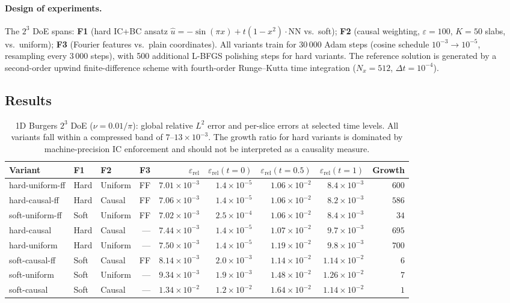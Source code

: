 \documentclass{article}
\newcommand{\relL}{\varepsilon_{\mathrm{rel}}}
\begin{document}
\paragraph{Design of experiments.}
The $2^3$ DoE spans: \textbf{F1} (hard IC+BC ansatz
$\hat{u} = -\sin(\pi x) + t(1{-}x^2)\cdot\mathrm{NN}$ vs.\ soft);
\textbf{F2} (causal weighting, $\varepsilon=100$, $K=50$ slabs,
vs.\ uniform); \textbf{F3} (Fourier features vs.\ plain coordinates).
All variants train for 30\,000 Adam steps (cosine schedule $10^{-3}\to10^{-5}$,
resampling every 3\,000 steps), with 500 additional L-BFGS polishing steps for
hard variants.
The reference solution is generated by a second-order upwind finite-difference
scheme with fourth-order Runge--Kutta time integration ($N_x = 512$,
$\Delta t = 10^{-4}$).

\subsection{Results}

\begin{table}[h]
\centering
\caption{1D Burgers $2^3$ DoE ($\nu=0.01/\pi$): global relative $L^2$ error
and per-slice errors at selected time levels.
All variants fall within a compressed band of $7\text{--}13\times10^{-3}$.
The growth ratio for hard variants is dominated by machine-precision IC
enforcement and should not be interpreted as a causality measure.}
\label{tab:burgers}
\small
\begin{tabular}{lllrrrrrr}
\toprule
Variant & F1 & F2 & F3 & $\relL$
        & $\relL(t{=}0)$ & $\relL(t{=}0.5)$ & $\relL(t{=}1)$ & Growth \\
\midrule
hard-uniform-ff & Hard & Uniform & FF  & $7.01\times10^{-3}$
  & $1.4\times10^{-5}$ & $1.06\times10^{-2}$ & $8.4\times10^{-3}$ & $600$ \\
hard-causal-ff  & Hard & Causal  & FF  & $7.06\times10^{-3}$
  & $1.4\times10^{-5}$ & $1.06\times10^{-2}$ & $8.2\times10^{-3}$ & $586$ \\
soft-uniform-ff & Soft & Uniform & FF  & $7.02\times10^{-3}$
  & $2.5\times10^{-4}$ & $1.06\times10^{-2}$ & $8.4\times10^{-3}$ & $34$ \\
hard-causal     & Hard & Causal  & --- & $7.44\times10^{-3}$
  & $1.4\times10^{-5}$ & $1.07\times10^{-2}$ & $9.7\times10^{-3}$ & $695$ \\
hard-uniform    & Hard & Uniform & --- & $7.50\times10^{-3}$
  & $1.4\times10^{-5}$ & $1.19\times10^{-2}$ & $9.8\times10^{-3}$ & $700$ \\
soft-causal-ff  & Soft & Causal  & FF  & $8.14\times10^{-3}$
  & $2.0\times10^{-3}$ & $1.14\times10^{-2}$ & $1.14\times10^{-2}$ & $6$ \\
soft-uniform    & Soft & Uniform & --- & $9.34\times10^{-3}$
  & $1.9\times10^{-3}$ & $1.48\times10^{-2}$ & $1.26\times10^{-2}$ & $7$ \\
soft-causal     & Soft & Causal  & --- & $1.34\times10^{-2}$
  & $1.2\times10^{-2}$ & $1.64\times10^{-2}$ & $1.14\times10^{-2}$ & $1$ \\
\bottomrule
\end{tabular}
\end{table}
\end{document}
